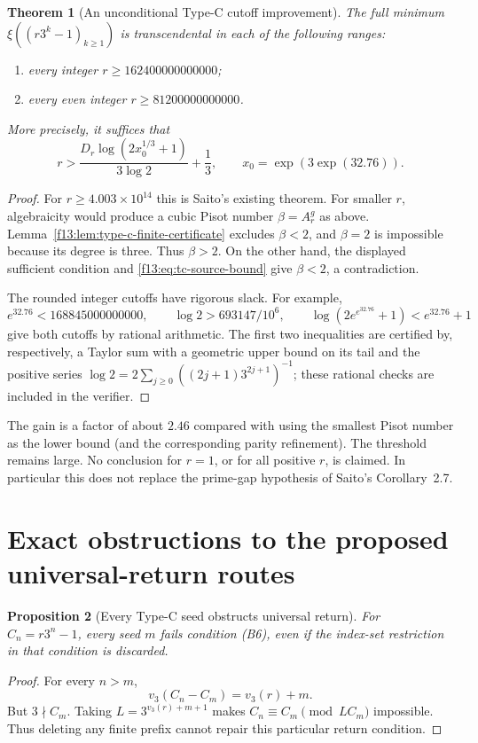 \documentclass[11pt,a4paper]{article}
\newtheorem{theorem}{Theorem}[section]
\newtheorem{proposition}[theorem]{Proposition}
\theoremstyle{definition}
\theoremstyle{remark}
\numberwithin{equation}{section}
\begin{document}
\begin{theorem}[An unconditional Type-C cutoff improvement]
\label{f13:thm:type-c-cutoff-new}
The full minimum $\xi((r3^k-1)_{k\ge1})$ is transcendental in each
of the following ranges:
\begin{enumerate}
\item every integer $r\ge162400000000000$;
\item every even integer $r\ge81200000000000$.
\end{enumerate}
More precisely, it suffices that
\[
 r>\frac{D_r\log(2x_0^{1/3}+1)}{3\log2}+\frac13,
 \qquad x_0=\exp(3\exp(32.76)).
\]
\end{theorem}
\begin{proof}
For $r\ge4.003\times10^{14}$ this is Saito's existing theorem.
For smaller $r$, algebraicity would produce a cubic Pisot number
$\beta=A_r^g$ as above.  Lemma~\ref{f13:lem:type-c-finite-certificate}
excludes $\beta<2$, and $\beta=2$ is impossible because its degree
is three.  Thus $\beta>2$.  On the other hand, the displayed
sufficient condition and \eqref{f13:eq:tc-source-bound} give $\beta<2$,
a contradiction.

The rounded integer cutoffs have rigorous slack.  For example,
\[
 e^{32.76}<168845000000000,\qquad
 \log2>693147/10^6,\qquad
 \log(2e^{e^{32.76}}+1)<e^{32.76}+1
\]
give both cutoffs by rational arithmetic.  The first two inequalities
are certified by, respectively, a Taylor sum with a geometric upper
bound on its tail and the positive series
$\log2=2\sum_{j\ge0}((2j+1)3^{2j+1})^{-1}$; these rational checks
are included in the verifier.
\end{proof}

The gain is a factor of about $2.46$ compared with using the smallest
Pisot number as the lower bound (and the corresponding parity refinement).
The threshold remains large.  No conclusion for $r=1$, or for all
positive $r$, is claimed.  In particular this does not replace the
prime-gap hypothesis of Saito's Corollary~2.7.

\section{Exact obstructions to the proposed universal-return routes}

\begin{proposition}[Every Type-C seed obstructs universal return]
For $C_n=r3^n-1$, every seed $m$ fails condition (B6), even if the
index-set restriction in that condition is discarded.
\end{proposition}
\begin{proof}
For every $n>m$,
\[
 v_3(C_n-C_m)=v_3(r)+m.
\]
But $3\nmid C_m$.  Taking $L=3^{v_3(r)+m+1}$ makes
$C_n\equiv C_m\pmod{LC_m}$ impossible.  Thus deleting any finite
prefix cannot repair this particular return condition.
\end{proof}
\end{document}
